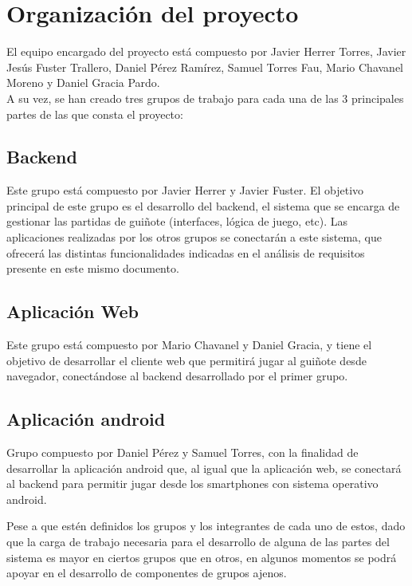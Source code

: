 \documentclass{article}
\begin{document}
\section{Organización del proyecto}
El equipo encargado del proyecto está compuesto por Javier Herrer Torres, Javier Jesús Fuster Trallero, Daniel Pérez Ramírez, Samuel Torres Fau, Mario Chavanel Moreno y Daniel Gracia Pardo. \\A su vez, se han creado tres grupos de trabajo para cada una de las 3 principales partes de las que consta el proyecto:
\subsection{Backend}
Este grupo está compuesto por Javier Herrer y Javier Fuster. El objetivo principal de este grupo es el desarrollo del backend, el sistema que se encarga de gestionar las partidas de guiñote (interfaces, lógica de juego, etc). Las aplicaciones realizadas por los otros grupos se conectarán a este sistema, que ofrecerá las distintas funcionalidades indicadas en el análisis de requisitos presente en este mismo documento.

\subsection{Aplicación Web}
Este grupo está compuesto por Mario Chavanel y Daniel Gracia, y tiene el objetivo de desarrollar el cliente web que permitirá jugar al guiñote desde navegador, conectándose al backend desarrollado por el primer grupo.

\subsection{Aplicación android}
Grupo compuesto por Daniel Pérez y Samuel Torres, con la finalidad de desarrollar la aplicación android que, al igual que la aplicación web, se conectará al backend para permitir jugar desde los smartphones con sistema operativo android.

Pese a que estén definidos los grupos y los integrantes de cada uno de estos, dado que la carga de trabajo necesaria para el desarrollo de alguna de las partes del sistema es mayor en ciertos grupos que en otros, en algunos momentos se podrá apoyar en el desarrollo de componentes de grupos ajenos.
\end{document}
